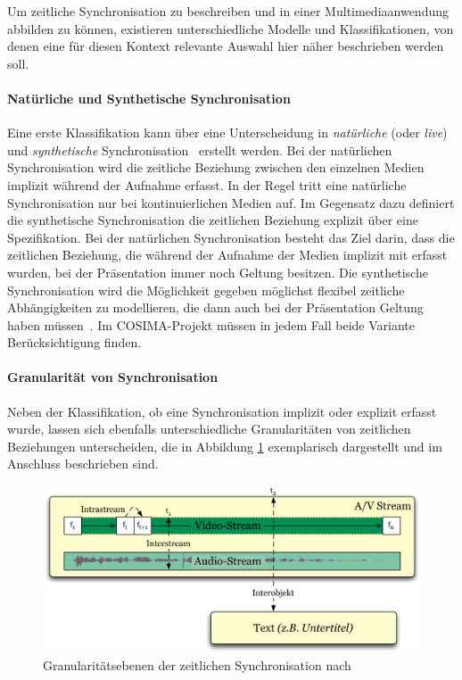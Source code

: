   Um zeitliche Synchronisation zu beschreiben und in einer Multimediaanwendung abbilden zu können, existieren unterschiedliche Modelle und Klassifikationen, von denen eine für diesen Kontext relevante Auswahl hier näher beschrieben werden soll.
  
\paragraph{Natürliche und Synthetische Synchronisation} %
\label{par:natuerliche_und_synthetische_synchronisation}

  Eine erste Klassifikation kann über eine Unterscheidung in \emph{natürliche} (oder \emph{live}) und \emph{synthetische} Synchronisation~\citep{little1991ms,little1991msp,steinmetz1992mst} erstellt werden. Bei der natürlichen Synchronisation wird die zeitliche Beziehung zwischen den einzelnen Medien implizit während der Aufnahme erfasst. In der Regel tritt eine natürliche Synchronisation nur bei kontinuierlichen Medien auf. Im Gegensatz dazu definiert die synthetische Synchronisation die zeitlichen Beziehung explizit über eine Spezifikation. Bei der natürlichen Synchronisation besteht das Ziel darin, dass die zeitlichen Beziehung, die während der Aufnahme der Medien implizit mit erfasst wurden, bei der Präsentation immer noch Geltung besitzen. Die synthetische Synchronisation wird die Möglichkeit gegeben möglichst flexibel zeitliche Abhängigkeiten zu modellieren, die dann auch bei der Präsentation Geltung haben müssen~\citep[S. 613]{bertino1998tsm}. Im COSIMA-Projekt müssen in jedem Fall beide Variante Berücksichtigung finden.
  

\paragraph{Granularität von Synchronisation} %
\label{par:granularitaet_von_synchronisation}

  Neben der Klassifikation, ob eine Synchronisation implizit oder explizit erfasst wurde, lassen sich ebenfalls unterschiedliche Granularitäten von zeitlichen Beziehungen unterscheiden, die in Abbildung \ref{fig:granularitaetsebenen} exemplarisch dargestellt und im Anschluss beschrieben sind.
  
  \begin{figure}[!ht]
    \centering
      \includegraphics[width=.9\textwidth]{images/Granularitaetsebenen.pdf}
    \caption{Granularitätsebenen der zeitlichen Synchronisation nach~\citep{antons09}}
    \label{fig:granularitaetsebenen}
  \end{figure}
  
